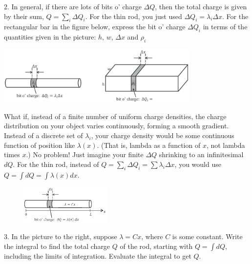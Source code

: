 2. In general, if there are lots of bits o' charge $\Delta Q$, then the total charge is given by their sum, $Q = \sum_i \Delta Q_i$. For the thin rod, you just used $\Delta Q_i = \lambda_i \Delta x$.  For the rectangular bar in the figure below, express the bit o' charge $\Delta Q_i$ in terms of the quantities given in the picture: $h$, $w$, $\Delta x$ and $\rho_i$

\vspace{-0.2 in}
\begin{center}
\includegraphics[width=0.75\textwidth]{charge_density/fig2.eps}
\vspace{-0.2in}
\end{center}
What if, instead of a finite number of uniform charge densities, the charge distribution on your object varies continuously, forming a smooth gradient. Instead of a discrete set of $\lambda_i$, your charge density would be some continuous function of position like $\lambda(x)$.  (That is, lambda as a function of $x$, not lambda times $x$.) No problem! Just imagine your finite $\Delta Q$ shrinking to an infinitesimal $dQ$.  For the thin rod, instead of $Q= \sum_i \Delta Q_i = \sum \lambda_i \Delta x$, you would use $Q = \int dQ = \int \lambda \left(x\right) dx$. 

\begin{figure}
\vspace{-0.4 in}
    \includegraphics[width=0.4\textwidth]{charge_density/fig3.eps}
\end{figure}
\vspace{0.2 in}
3. In the picture to the right, suppose $\lambda = Cx$, where $C$ is some constant. Write the integral to find the total charge $Q$ of the rod, starting with $Q = \int dQ$, including the limits of integration.  Evaluate the integral to get $Q$.

